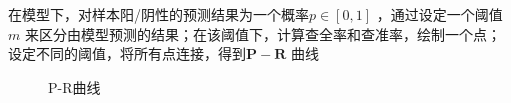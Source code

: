 \begin{notation}
    在模型下，对样本阳/阴性的预测结果为一个概率$p \in [0,1]$ ，通过设定一个阈值$m$ 来区分由模型预测的结果；在该阈值下，计算查全率和查准率，绘制一个点；设定不同的阈值，将所有点连接，得到$\bm{P}-\bm{R}$ 曲线
\end{notation}
\begin{figure}[ht]
    \centering
    \caption{P-R曲线}
    \label{fig:p-r曲线}
\end{figure}


